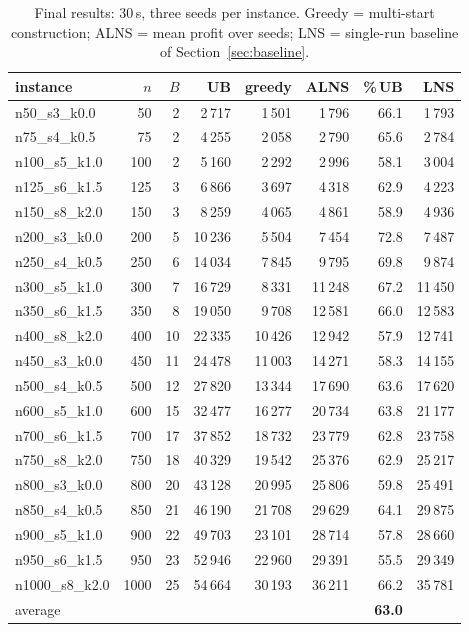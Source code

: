 \documentclass[10pt, a4paper]{article}
\newcommand{\ub}{\%\,UB}
\begin{document}
\begin{table}[t]
\centering\small
\caption{Final results: 30\,s, three seeds per instance. Greedy = multi-start
construction; ALNS = mean profit over seeds; LNS = single-run baseline of
Section~\ref{sec:baseline}.}
\label{tab:final}
\begin{tabular}{lrrrrrrr}
\toprule
instance & $n$ & $B$ & UB & greedy & ALNS & \ub & LNS \\
\midrule
n50\_s3\_k0.0   &   50 &  2 &  2\,717 &  1\,501 &  1\,796 & 66.1 &  1\,793 \\
n75\_s4\_k0.5   &   75 &  2 &  4\,255 &  2\,058 &  2\,790 & 65.6 &  2\,784 \\
n100\_s5\_k1.0  &  100 &  2 &  5\,160 &  2\,292 &  2\,996 & 58.1 &  3\,004 \\
n125\_s6\_k1.5  &  125 &  3 &  6\,866 &  3\,697 &  4\,318 & 62.9 &  4\,223 \\
n150\_s8\_k2.0  &  150 &  3 &  8\,259 &  4\,065 &  4\,861 & 58.9 &  4\,936 \\
n200\_s3\_k0.0  &  200 &  5 & 10\,236 &  5\,504 &  7\,454 & 72.8 &  7\,487 \\
n250\_s4\_k0.5  &  250 &  6 & 14\,034 &  7\,845 &  9\,795 & 69.8 &  9\,874 \\
n300\_s5\_k1.0  &  300 &  7 & 16\,729 &  8\,331 & 11\,248 & 67.2 & 11\,450 \\
n350\_s6\_k1.5  &  350 &  8 & 19\,050 &  9\,708 & 12\,581 & 66.0 & 12\,583 \\
n400\_s8\_k2.0  &  400 & 10 & 22\,335 & 10\,426 & 12\,942 & 57.9 & 12\,741 \\
n450\_s3\_k0.0  &  450 & 11 & 24\,478 & 11\,003 & 14\,271 & 58.3 & 14\,155 \\
n500\_s4\_k0.5  &  500 & 12 & 27\,820 & 13\,344 & 17\,690 & 63.6 & 17\,620 \\
n600\_s5\_k1.0  &  600 & 15 & 32\,477 & 16\,277 & 20\,734 & 63.8 & 21\,177 \\
n700\_s6\_k1.5  &  700 & 17 & 37\,852 & 18\,732 & 23\,779 & 62.8 & 23\,758 \\
n750\_s8\_k2.0  &  750 & 18 & 40\,329 & 19\,542 & 25\,376 & 62.9 & 25\,217 \\
n800\_s3\_k0.0  &  800 & 20 & 43\,128 & 20\,995 & 25\,806 & 59.8 & 25\,491 \\
n850\_s4\_k0.5  &  850 & 21 & 46\,190 & 21\,708 & 29\,629 & 64.1 & 29\,875 \\
n900\_s5\_k1.0  &  900 & 22 & 49\,703 & 23\,101 & 28\,714 & 57.8 & 28\,660 \\
n950\_s6\_k1.5  &  950 & 23 & 52\,946 & 22\,960 & 29\,391 & 55.5 & 29\,349 \\
n1000\_s8\_k2.0 & 1000 & 25 & 54\,664 & 30\,193 & 36\,211 & 66.2 & 35\,781 \\
\midrule
average &&&&&& \textbf{63.0} & \\
\bottomrule
\end{tabular}
\end{table}
\end{document}
